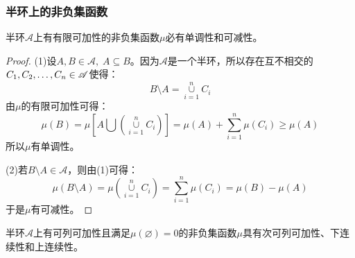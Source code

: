 \subsubsection{半环上的非负集函数}
\begin{theorem}\label{theo:SemiringFiniteAdditivitySetfunction}
	半环$\mathscr{A}$上有有限可加性的非负集函数$\mu$必有单调性和可减性。
\end{theorem}
\begin{proof}
	(1)设$A,B\in\mathscr{A},\;A\subseteq B$。因为$\mathscr{A}$是一个半环，所以存在互不相交的$C_1, C_2, \dots, C_{n}\in\mathscr{A}$使得：
	\begin{equation*}
		B\setminus A=\underset{i=1}{\overset{n}{\cup}}C_i
	\end{equation*}
	由$\mu$的有限可加性可得：
	\begin{equation*}
		\mu(B)=\mu\left[A\bigcup\left(\underset{i=1}{\overset{n}{\cup}}C_i\right)\right]=\mu(A)+\sum_{i=1}^{n}\mu(C_i)\geqslant\mu(A)
	\end{equation*}
	所以$\mu$有单调性。\par
	(2)若$B\setminus A\in\mathscr{A}$，则由(1)可得：
	\begin{equation*}
		\mu(B\setminus A)=\mu\left(\underset{i=1}{\overset{n}{\cup}}C_i\right)=\sum_{i=1}^{n}\mu(C_i)=\mu(B)-\mu(A)
	\end{equation*}
	于是$\mu$有可减性。
\end{proof}
\begin{theorem}\label{theo:SemiringCountableAdditivitySetFunction}
	半环$\mathscr{A}$上有可列可加性且满足$\mu(\varnothing)=0$的非负集函数$\mu$具有次可列可加性、下连续性和上连续性。
\end{theorem}

